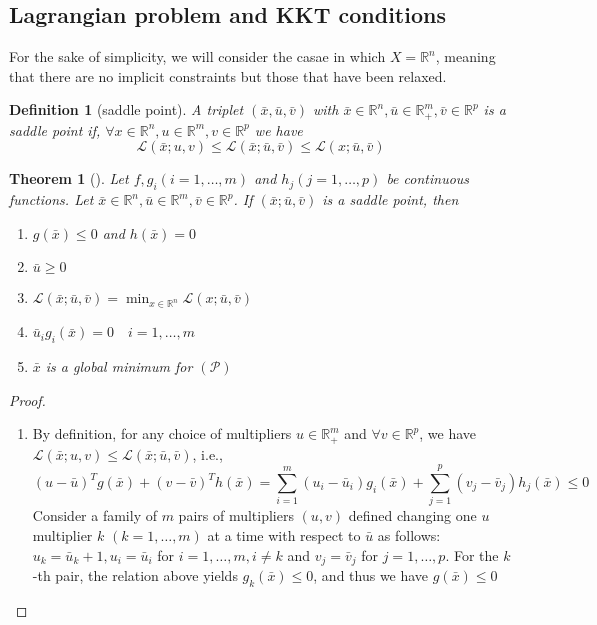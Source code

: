 \documentclass{book}
\newcommand{\R}{\mathbb{R}}
\theoremstyle{theoremv2}
\newtheorem{theorem}{Theorem}[chapter]
\theoremstyle{defv2}
\newtheorem{definition}{Definition}[chapter]
\theoremstyle{remark}
\theoremstyle{remark}
\begin{document}
\subsection{Lagrangian problem and KKT conditions}
For the sake of simplicity, we will consider the casae in which $X=\R^n$, meaning that there are no implicit constraints but those that have been relaxed.
\begin{definition}[saddle point]
    A triplet $(\bar{x},\bar{u},\bar{v})$ with $\bar{x}\in\R^n,\bar{u}\in\R_+^m,\bar{v}\in\R^p$ is a \emph{saddle point} if, $\forall x \in \R^n, u\in\R^m,v\in\R^p$ we have
    \[
        \mathcal{L}(\bar{x};u,v) \leq \mathcal{L}(\bar{x};\bar{u},\bar{v})\leq\mathcal{L}(x;\bar{u},\bar{v})
    \]
\end{definition}
\begin{theorem}[]
    Let $f,g_i(i=1,\dots,m)$ and $h_j(j=1,\dots,p)$ be continuous functions. Let $\bar{x}\in\R^n,\bar{u}\in\R^m,\bar{v}\in\R^p$. If $(\bar{x};\bar{u},\bar{v})$ is a saddle point, then
    \begin{enumerate}
        \item $g(\bar{x})\leq 0$ and $h(\bar{x})=0$
        \item $\bar{u}\geq 0$
        \item $\mathcal{L}(\bar{x};\bar{u},\bar{v}) = \min_{x\in\R^n}\mathcal{L}(x;\bar{u},\bar{v})$
        \item $\bar{u}_ig_i(\bar{x})=0\quad i=1,\dots,m$
        \item $\bar{x}$ is a global minimum for $(\mathcal{P})$
    \end{enumerate}
\end{theorem}
\begin{proof}[Proof]
    \begin{enumerate}
        \item By definition, for any choice of multipliers $u\in\R^m_+$ and $\forall v \in\R^p$, we have $\mathcal{L}(\bar{x};u,v)\leq\mathcal{L}(\bar{x};\bar{u},\bar{v})$, i.e.,
            \[
                (u-\bar{u})^Tg(\bar{x})+(v-\bar{v})^Th(\bar{x}) = \displaystyle\sum_{i=1}^{m}(u_i-\bar{u}_i)g_i(\bar{x}) + \displaystyle\sum_{j=1}^{p}(v_j-\bar{v}_j)h_j(\bar{x})\leq 0
            \]
            Consider a family of $m$ pairs of multipliers $(u,v)$ defined changing one $u$ multiplier $k$ $(k=1,\dots,m)$ at a time with respect to $\bar{u}$ as follows: $u_k=\bar{u}_k+1,u_i=\bar{u}_i$ for $i=1,\dots,m,i\neq k$ and $v_j=\bar{v}_j$ for $j=1,\dots,p$. For the $k$-th pair, the relation above yields $g_k(\bar{x})\leq 0$, and thus we have $g(\bar{x})\leq0$
    \end{enumerate}
\end{proof}
\end{document}
